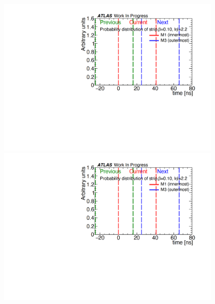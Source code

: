 \begin{figure}[tbp]
\begin{minipage}{0.33\hsize}
    \end{minipage}\\
    \begin{minipage}{0.33\hsize}
    \centering   
    \includegraphics[width=\textwidth,page=11]{img/rec/rec_e2.2_s.pdf}
    \subcaption{}
    \end{minipage}
    \begin{minipage}{0.33\hsize}
    \centering   
    \includegraphics[width=\textwidth,page=9]{img/rec/rec_e2.2_s.pdf}
    \subcaption{}
    \end{minipage}
    \begin{minipage}{0.33\hsize}
    \centering   

\end{minipage}
\end{figure}
